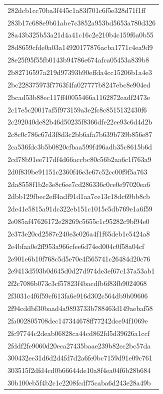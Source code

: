\begin{tabular}{l}
282dcb1cc70ba3f445c1a83f701c6f5e328d71f1ff \\
283b17c688e9b61abe7c3852a953bd5653a780d326 \\
28a43b325b53a21d4a41c16c2e210b4c159f6a0b55 \\
28d8659cfde0a03a14920177876acba1771c4ea9d9 \\
28e25f95f55fb0143b94786e674afca05453a839b8 \\
2b82716597a219d97393b90effda4cc15206b1a4e3 \\
2bc228375973f7763f4fa027777b8247ebc8e904ed \\
2bcad53b88ec117ff40055466a1162872eadf2473e \\
2c17e5c20017af5f973159a3e2fc8c8515132430f6 \\
2c292040de82b46d50235f8366dfe22ee93c6d4d2b \\
2c8c0c786c67d3f8d3c2bb6afa7b639b739b856e87 \\
2ca536fdc3b5b0820cfbaa599f496adb35c8615b6d \\
2cd78b91ee717df4d66accbc80c56b2aa6c1f763a9 \\
2d0f839be91151c2360f46e3e67c52cc00f9f5a763 \\
2da8558f1b2c3e8c6ee7cd286336c0ce0e97020ea6 \\
2dbb129fbec2eff4adf91d1aa7ce13c18dc69bb8cb \\
2de41e5815a91dc322eb151c1015e5db769e1a6f59 \\
2e085af47626172e28269c5655c1c95282c9bf94e0 \\
2e373e20cd2587e240e3e026a4f1f65deb1e5424a8 \\
2e4bfaa0e2ff953a966cfee6d74ed004c0f58a04cf \\
2e901e6b10f768c5d5e70e4f565741c26484d20c76 \\
2e9413d593b0d645d0d27d974de3ef67c137a53ab1 \\
2f2c7086b073c3cf57823f4bacdfb6f83fb9024068 \\
2f3031c4f6f59cf613fa6e916d302c564db9b09606 \\
2f94cddbf30baad4a9893733b788463d149aebaf58 \\
2fa002805708dec147344678ff77242dce94f1069e \\
2fc97744c2deab06828ca44cd862fd5d39626a1ccf \\
2fddf2fe9060d20eca27435baae239b82cc2bc57da \\
300432ee31d6d2d4fd7d2a6fe0bc7159d91e09c761 \\
303515f2dfd4cd0b66644de10a8f4ea04f6b28b684 \\
30b100eb5f4b2c1e2208fcdf75caba6d243e28a49b \\

\end{tabular}
